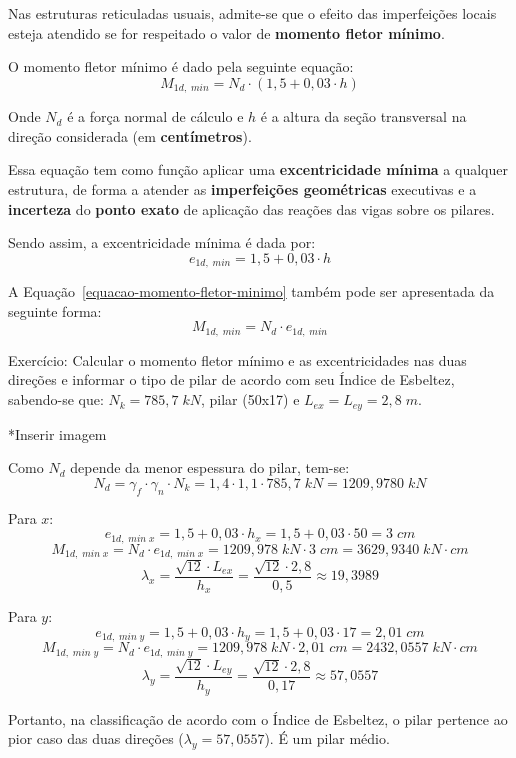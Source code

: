 Nas estruturas reticuladas usuais, admite-se que o efeito das imperfeições locais esteja atendido se for respeitado o valor de \textbf{momento fletor mínimo}.

O momento fletor mínimo é dado pela seguinte equação:
\begin{equation}
	\label{equacao-momento-fletor-minimo}
	M_{1d,\;min}=N_d\cdot(1,5+0,03\cdot h)
\end{equation}

Onde $N_d$ é a força normal de cálculo e $h$ é a altura da seção transversal na direção considerada (em \textbf{centímetros}).

Essa equação tem como função aplicar uma \textbf{excentricidade mínima} a qualquer estrutura, de forma a atender as \textbf{imperfeições geométricas} executivas e a \textbf{incerteza} do \textbf{ponto exato} de aplicação das reações das vigas sobre os pilares.

Sendo assim, a excentricidade mínima é dada por:
\begin{equation}e_{1d,\;min}=1,5+0,03\cdot h\end{equation}

A Equação~\eqref{equacao-momento-fletor-minimo} também pode ser apresentada da seguinte forma:
\begin{equation}M_{1d,\;min}=N_d\cdot e_{1d,\;min}\end{equation}

Exercício: Calcular o momento fletor mínimo e as excentricidades nas duas direções e informar o tipo de pilar de acordo com seu Índice de Esbeltez, sabendo-se que: $N_k=785,7\;kN$, pilar (50x17) e $L_{ex}=L_{ey}=2,8\;m$.

*Inserir imagem

Como $N_d$ depende da menor espessura do pilar, tem-se:
$$N_d=\gamma_f\cdot\gamma_n\cdot N_k=1,4\cdot1,1\cdot785,7\;kN=1209,9780\;kN$$

Para $x$:
$$e_{1d,\;min\;x}=1,5+0,03\cdot h_x=1,5+0,03\cdot50=3\;cm$$
$$M_{1d,\;min\;x}=N_d\cdot e_{1d,\;min\;x}=1209,978\;kN\cdot3\;cm=3629,9340\;kN\cdot cm$$
$$\lambda_x=\frac{\sqrt{12}\cdot L_{ex}}{h_x}=\frac{\sqrt{12}\cdot2,8}{0,5}\approx19,3989$$

Para $y$:
$$e_{1d,\;min\;y}=1,5+0,03\cdot h_y=1,5+0,03\cdot17=2,01\;cm$$
$$M_{1d,\;min\;y}=N_d\cdot e_{1d,\;min\;y}=1209,978\;kN\cdot2,01\;cm=2432,0557\;kN\cdot cm$$
$$\lambda_y=\frac{\sqrt{12}\cdot L_{ey}}{h_y}=\frac{\sqrt{12}\cdot2,8}{0,17}\approx57,0557$$

Portanto, na classificação de acordo com o Índice de Esbeltez, o pilar pertence ao pior caso das duas direções ($\lambda_y=57,0557$). É um pilar médio.